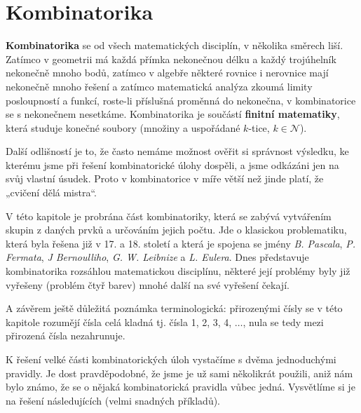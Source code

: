 \graphicspath{{../src/MAI/img/}}
\setchaptertoc
\chapter{Kombinatorika}\label{mai:IchapIVc}
  \textbf{Kombinatorika} se od všech matematických disciplín, v několika směrech liší. Zatímco v
  geometrii má každá přímka nekonečnou délku a každý trojúhelník nekonečně mnoho bodů, zatímco v
  algebře některé rovnice i nerovnice mají nekonečně mnoho řešení a zatímco matematická analýza
  zkoumá limity posloupností a funkcí, roste-li příslušná proměnná do nekonečna, v kombinatorice se
  s nekonečnem nesetkáme. Kombinatorika je součástí \textbf{finitní matematiky}, která studuje
  konečné soubory (množiny a uspořádané \(k\)-tice, \(k\in \mathcal{N}\)). 
  
  Další odlišností je to, že často nemáme možnost ověřit si správnost výsledku, ke kterému jsme při
  řešení kombinatorické úlohy dospěli, a jsme odkázáni jen na svůj vlastní úsudek. Proto v
  kombinatorice v míře větší než jinde platí, že „cvičení dělá mistra“. 
  
  V této kapitole je probrána část kombinatoriky, která se zabývá vytvářením skupin z daných prvků a
  určováním jejich počtu. Jde o klasickou problematiku, která byla řešena již v 17. a 18. století a
  která je spojena se jmény \emph{B. Pascala}, \emph{P. Fermata}, \emph{J Bernoulliho}, \emph{G. W.
  Leibnize}  a \emph{L. Eulera}. Dnes představuje kombinatorika rozsáhlou matematickou disciplínu,
  některé její problémy byly již vyřešeny (problém čtyř barev) mnohé další na své vyřešení čekají. 
  
  A závěrem ještě důležitá poznámka terminologická: přirozenými čísly se v této kapitole rozumějí
  čísla celá kladná tj. čísla 1, 2, 3, 4, \(\ldots\), nula se tedy mezi přirozená čísla nezahrunuje.
  \cite[s.~7]{calda2008matematika} 
    
    K řešení velké části kombinatorických úloh vystačíme s dvěma jednoduchými pravidly. Je dost
    pravděpodobné, že jsme je už sami několikrát použili, aniž nám bylo známo, že se o nějaká
    kombinatorická pravidla vůbec jedná. Vysvětlíme si je na řešení následujících (velmi snadných
    příkladů).

